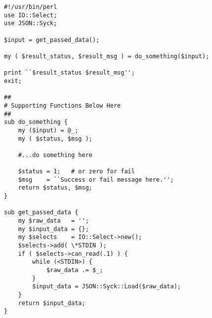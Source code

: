 \begin{verbatim}
#!/usr/bin/perl 
use IO::Select;
use JSON::Syck;

$input = get_passed_data();

my ( $result_status, $result_msg ) = do_something($input);

print ``$result_status $result_msg'';
exit;

##
# Supporting Functions Below Here
##
sub do_something {
    my ($input) = @_;
    my ( $status, $msg );

    #...do something here

    $status = 1;   # or zero for fail
    $msg    = ``Success or fail message here.'';
    return $status, $msg;
}

sub get_passed_data {
    my $raw_data   = '';
    my $input_data = {};
    my $selects    = IO::Select->new();
    $selects->add( \*STDIN );
    if ( $selects->can_read(.1) ) {
        while (<STDIN>) {
            $raw_data .= $_;
        }
        $input_data = JSON::Syck::Load($raw_data);
    }
    return $input_data;
} 
\end{verbatim}
